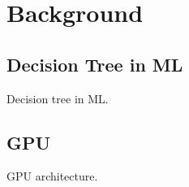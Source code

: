 \section{Background}

\subsection{Decision Tree in ML}

Decision tree in ML.

\subsection{GPU}

GPU architecture.